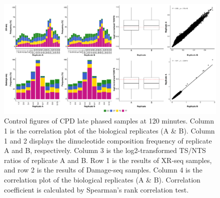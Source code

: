 \begin{figure}[H]
    \begin{center}
    \includegraphics[width=\textwidth]{Chapters/7_appendix/figures/supfig9}
    \caption[Control figures of CPD late phased samples at 120 minutes.]{Control figures of CPD late phased samples at 120 minutes. Column 1 is the correlation plot of the biological replicates (A \& B). Column 1 and 2 displays the dinucleotide composition frequency of replicate A and B, respectively. Column 3 is the log2-transformed TS/NTS ratios of replicate A and B. Row 1 is the results of XR-seq samples, and row 2 is the results of Damage-seq samples. Column 4 is the correlation plot of the biological replicates (A \& B). Correlation coefficient is calculated by Spearman’s rank correlation test.}
    \label{supfig:control8}
    \end{center}
    \end{figure}

